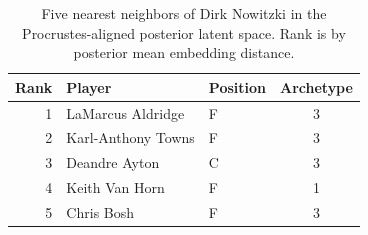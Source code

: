 \begin{table}[htbp]
  \centering\small
  \begin{tabular}{rllc}
    \toprule
    Rank & Player & Position & Archetype \\
    \midrule
    1 & LaMarcus Aldridge & F & 3 \\
    2 & Karl-Anthony Towns & F & 3 \\
    3 & Deandre Ayton & C & 3 \\
    4 & Keith Van Horn & F & 1 \\
    5 & Chris Bosh & F & 3 \\
    \bottomrule
  \end{tabular}
  \caption{Five nearest neighbors of Dirk Nowitzki in the Procrustes-aligned posterior latent space. Rank is by posterior mean embedding distance.}
  \label{tab:Dirk_Nowitzki_neighbors}
\end{table}

